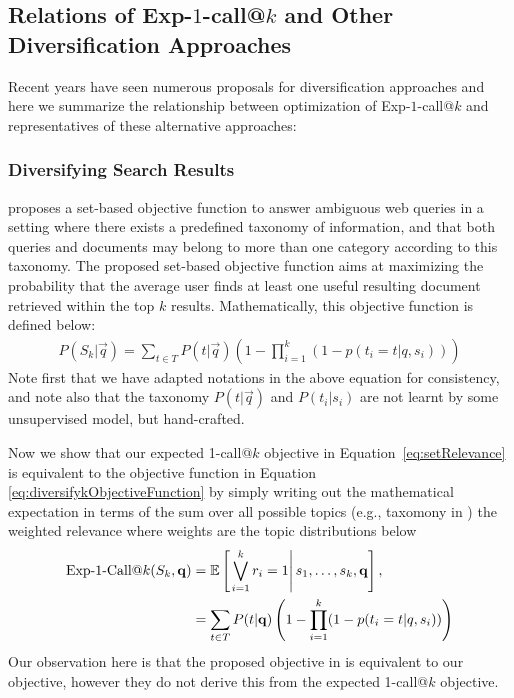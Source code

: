 \subsection{Relations of Exp-$1$-call@$k$ and Other Diversification Approaches}

Recent years have seen numerous proposals for diversification
approaches and here we summarize the relationship between optimization
of Exp-$1$-call@$k$ and representatives of these alternative
approaches:

\subsubsection{Diversifying Search Results}
\cite{agrawal09diversifying} proposes a set-based objective function
to answer ambiguous web queries in a setting where there exists a predefined taxonomy of information, and that both queries and documents
may belong to more than one category according to this taxonomy. The proposed set-based objective function aims at maximizing the probability that the average user finds at least one useful resulting document retrieved within the top $k$ results. Mathematically, this objective function is defined below:
\begin{align}
	P(S_k|\vec{q}) = \sum_{t\in T} P(t|\vec{q}) \left( 1 - \prod_{i=1}^{k}(1-p(t_i = t| q, s_i))\right) 
\label{eq:diversifykObjectiveFunction}
\end{align}
Note first that we have adapted notations in the above equation for consistency, and note also that the taxonomy $P(t|\vec{q})$ and $P(t_i|s_i)$ are not learnt by some unsupervised model, but hand-crafted. 

Now we show that our expected 1-call@$k$ objective in Equation~\eqref{eq:setRelevance} is equivalent to the objective function in Equation \eqref{eq:diversifykObjectiveFunction} by simply writing out the mathematical expectation in terms of the sum over all possible topics (e.g., taxomony in \cite{agrawal09diversifying}) the weighted relevance where weights are the topic distributions below
\begin{align*}
    \ExpOneCall(S_k,\vec{q}) & = \mathbb{E} \left[\left. \bigvee_{i=1}^{k}r_i=1 \right| s_{1},\dots, s_{k},\vec{q} \right], \\
    												 & = \sum_{t\in T} P(t|\vec{q}) \left( 1 - \prod_{i=1}^{k}(1-p(t_i = t| q, s_i))\right) 
\end{align*}
Our observation here is that the proposed objective in \cite{agrawal09diversifying} is equivalent to our objective, however they do not derive this from the expected 1-call@$k$ objective.

